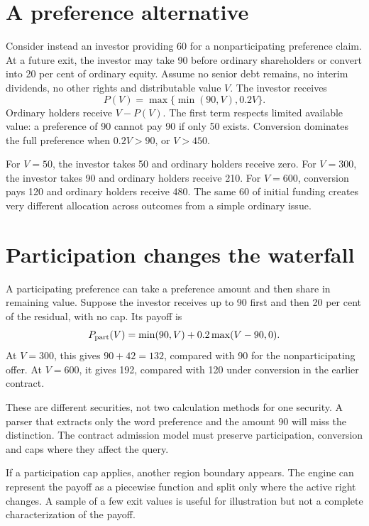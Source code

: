 \section{A preference alternative}
Consider instead an investor providing 60 for a nonparticipating preference claim. At a future exit, the investor may take 90 before ordinary shareholders or convert into 20 per cent of ordinary equity. Assume no senior debt remains, no interim dividends, no other rights and distributable value $V$. The investor receives
\begin{equation}
 P(V)=\max\{\min(90,V), 0.2V\}.
 \label{sim:preference-payoff}
\end{equation}
Ordinary holders receive $V-P(V)$. The first term respects limited available value: a preference of 90 cannot pay 90 if only 50 exists. Conversion dominates the full preference when $0.2V>90$, or $V>450$.

For $V=50$, the investor takes 50 and ordinary holders receive zero. For $V=300$, the investor takes 90 and ordinary holders receive 210. For $V=600$, conversion pays 120 and ordinary holders receive 480. The same 60 of initial funding creates very different allocation across outcomes from a simple ordinary issue.

\section{Participation changes the waterfall}
A participating preference can take a preference amount and then share in remaining value. Suppose the investor receives up to 90 first and then 20 per cent of the residual, with no cap. Its payoff is
\begin{equation}
 P_{\rm part}(V)=\min(90,V)+0.2\max(V-90,0).
\end{equation}
At $V=300$, this gives $90+42=132$, compared with 90 for the nonparticipating offer. At $V=600$, it gives 192, compared with 120 under conversion in the earlier contract.

These are different securities, not two calculation methods for one security. A parser that extracts only the word preference and the amount 90 will miss the distinction. The contract admission model must preserve participation, conversion and caps where they affect the query.

If a participation cap applies, another region boundary appears. The engine can represent the payoff as a piecewise function and split only where the active right changes. A sample of a few exit values is useful for illustration but not a complete characterization of the payoff.

